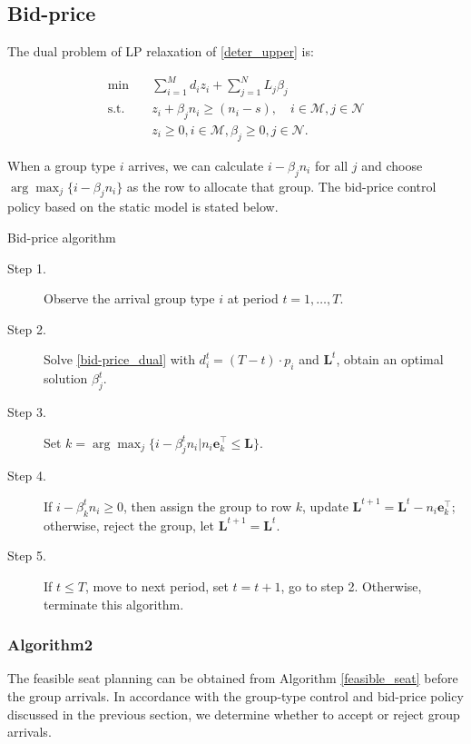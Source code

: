 \subsection{Bid-price}
The dual problem of LP relaxation of \eqref{deter_upper} is:

\begin{equation}\label{bid-price_dual}
  \begin{aligned}
  \min \quad & \sum_{i=1}^{M} d_i z_i + \sum_{j= 1}^{N} L_j \beta_{j} \\
  \text {s.t.} \quad & z_{i} + \beta_j n_i \geq (n_i-s), \quad i \in \mathcal{M}, j \in \mathcal{N} \\
  & z_{i} \geq 0, i \in \mathcal{M}, \beta_{j} \geq 0, j \in \mathcal{N}.
  \end{aligned}
\end{equation}

When a group type $i$ arrives, we can calculate $i -\beta_{j} n_i$ for all $j$ and choose $\arg \max_{j} \{i -\beta_{j} n_i\}$ as the row to allocate that group. The bid-price control policy based on the static model is stated below.

\begin{algorithm}[H]
  \caption{Bid-price algorithm}
  \begin{description}
    \item[Step 1.] Observe the arrival group type $i$ at period $t = 1, \ldots, T$.
    \item[Step 2.] Solve \eqref{bid-price_dual} with $d_i^{t} = (T-t) \cdot p_i$ and $\mathbf{L}^{t}$, obtain an optimal solution $\beta_{j}^{t}$.
    \item[Step 3.] Set $k = \arg \max_{j} \{i -\beta_{j}^{t} n_i | n_i \mathbf{e}_{k}^{\top} \leq \mathbf{L}\}$.
    \item[Step 4.] If $i -\beta_{k}^{t} n_i \geq 0$, then assign the group to row $k$, update $\mathbf{L}^{t+1} = \mathbf{L}^{t} - n_i \mathbf{e}_{k}^{\top}$; otherwise, reject the group, let $\mathbf{L}^{t+1} = \mathbf{L}^{t}$. 
    \item[Step 5.] If $t \leq T$, move to next period, set $t = t+1$, go to step 2. Otherwise, terminate this algorithm.
  \end{description}
\end{algorithm}

\subsubsection{Algorithm2}
The feasible seat planning can be obtained from Algorithm \ref{feasible_seat} before the group arrivals. In accordance with the group-type control and bid-price policy discussed in the previous section, we determine whether to accept or reject group arrivals.

